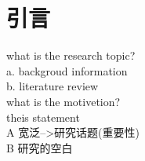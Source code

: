 \documentclass{cjc}
\begin{document}
\maketitle


\section{引言}
  what is the research topic?\\
  a. backgroud information \\
  b. literature review\\
  what is the motivetion?\\
  theis statement\\
  A 宽泛-->研究话题(重要性)\\
  B 研究的空白\\










\end{document}
